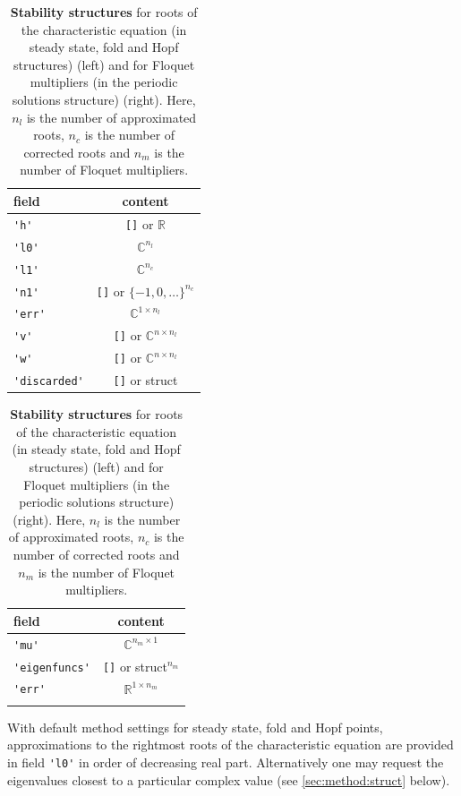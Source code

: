 \documentclass[10pt]{scrartcl}
\newcommand{\RR}{\mathbb{R}}
\newcommand{\CC}{\mathbb{C}}
\newcommand{\blist}[1]{\mbox{\lstinline!#1!}}
\begin{document}
\begin{table}[htbp]
  \begin{center}
    \begin{subtable}[t]{0.4\textwidth}
      \begin{tabular}[t]{lc}\hline\noalign{\smallskip}
        field & content    \\\hline\noalign{\smallskip}
        \blist{'h'}     & \blist{[]} or $\RR$  \\
        \blist{'l0'}    & $\CC^{n_l}$ \\
        \blist{'l1'}    & $\CC^{n_c}$ \\
        \blist{'n1'}    & \blist{[]} or $\{-1,0,\ldots\}^{n_c}$ \\
        \blist{'err'}    & $\CC^{1\times n_l}$ \\
        \blist{'v'} &\blist{[]} or $\CC^{n\times n_l}$ \\
        \blist{'w'} &\blist{[]} or $\CC^{n\times n_l}$ \\
        \blist{'discarded'} &\blist{[]} or struct \\\hline
      \end{tabular}
      \caption{Structure in field \blist{'stability'} for steady
        state, fold and Hopf points of Table~\ref{point_structures}}
    \end{subtable}\qquad
    \begin{subtable}[t]{0.35\textwidth}
      \begin{tabular}[t]{lc}\hline\noalign{\smallskip}
        field & content     \\\hline\noalign{\smallskip}
        \blist{'mu'}    & $\CC^{n_m\times 1}$ \\
        \blist{'eigenfuncs'} & \blist{[]} or struct$^{n_m}$\\
        \blist{'err'} & $\RR^{1\times n_m}$\\ \\\hline
      \end{tabular}
      \caption{Structure in field \blist{'stability'} for periodic
        orbit points of Table~\ref{point_structures}}
    \end{subtable}
  \end{center}
  \caption{\label{stab_structures}
    \textbf{\textsf{Stability structures}} for roots of the characteristic equation
    (in steady state, fold and Hopf structures) (left)
    and for Floquet multipliers (in the periodic solutions structure) (right). 
    Here, $n_l$ is the number of approximated roots,
    $n_c$ is the number of corrected roots and $n_m$ is the number
    of Floquet multipliers.}
\end{table}
With default method settings for steady state, fold and Hopf points,
approximations to the rightmost roots of the characteristic equation
are provided in field \blist{'l0'} in order of decreasing real
part. Alternatively one may request the eigenvalues closest to a
particular complex value (see \cref{sec:method:struct} below).
\end{document}
